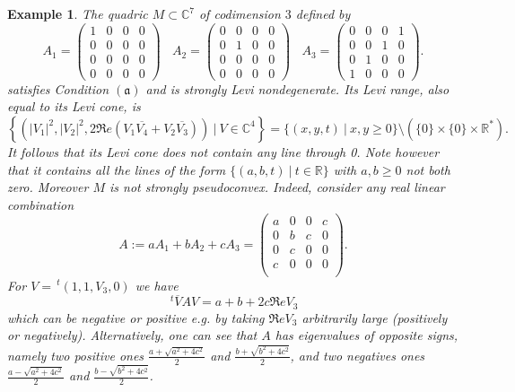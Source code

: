 \documentclass[10pt,a4paper]{amsart}
\newcommand{\C}{\mathbb C}
\newcommand{\R}{\mathbb R}
\newcommand{\transp}{\,^t}
\newcommand{\aaa}{\mathfrak{(a)}}
\newtheorem{example}[theo]{Example}
\numberwithin{equation}{section}
\begin{document}
\begin{example}\label{exline}
The quadric $M\subset \C^7$ of codimension $3$ defined by   
$$A_1=
\begin{pmatrix}
	1& 0 & 0 & 0 \\ 0 &0 & 0 & 0 \\ 0 &0 & 0 & 0 \\ 0 &0 & 0 & 0
\end{pmatrix} \ \ \ \ 
A_2=
\begin{pmatrix}
	0& 0 & 0 & 0 \\ 0 &1 & 0 & 0 \\ 0 &0 & 0 & 0 \\ 0 &0 & 0 & 0
\end{pmatrix}\ \ \ \ 
A_3=
\begin{pmatrix}
	0& 0 & 0 & 1 \\ 0 &0 & 1 & 0 \\ 0 &1 & 0 & 0 \\ 1 &0 & 0 & 0
\end{pmatrix}.$$
 satisfies Condition $\aaa$ and is strongly Levi nondegenerate. Its Levi range, also equal to its Levi cone, is 
  $$\left\{\left(|V_1|^2,|V_2|^2,2\Re e (V_1\overline{V_4}+V_2\overline{V_3})\right) \ | \ V\in \C^4 \right\} = \{ (x,y,t) \ | \ x, y\geq 0\} \setminus \left(\{0\}\times \{0\} \times \R^*\right).$$ 
It follows that its Levi cone
 does not contain any line through 0. Note however that it contains all the lines of the form $\{(a,b,t) \ | \ t \in \R\}$ with $a,b \geq 0$ not both zero.  Moreover  $M$ is not strongly pseudoconvex. Indeed, consider any real linear combination 
 $$A:=aA_1+bA_2+cA_3=\begin{pmatrix}
	a& 0 & 0 & c \\ 0 &b & c & 0 \\ 0 &c & 0 & 0 \\ c &0 & 0 & 0\\
\end{pmatrix}.$$
For $V=\transp (1,1,V_3,0)$ we have 
 $$\transp \overline{V} A V= a+b+2c\Re e V_3$$
 which can be  negative or positive e.g. by taking $\Re e V_3$ arbitrarily large (positively or negatively). Alternatively, one can see that $A$ has   
 eigenvalues of opposite signs, namely two positive ones $\frac{a+\sqrt{a^2+4c^2}}{2}$ and $\frac{b+\sqrt{b^2+4c^2}}{2}$,  and two negatives ones 
 $\frac{a-\sqrt{a^2+4c^2}}{2}$ and $\frac{b-\sqrt{b^2+4c^2}}{2}$.      
 
\end{example} 
\end{document}
